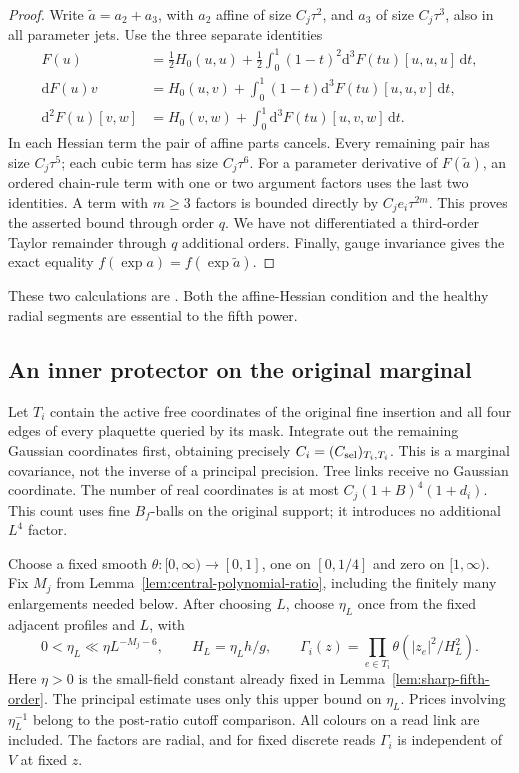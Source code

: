 \documentclass[11pt,reqno]{amsart}
\numberwithin{equation}{section}
\theoremstyle{definition}
\theoremstyle{remark}
\newcommand{\dd}{\mathrm d}
\begin{document}
\begin{proof}
Write \(\widetilde a=a_2+a_3\), with \(a_2\) affine of
size \(C_j\tau^2\), and \(a_3\) of size \(C_j\tau^3\),
also in all parameter jets. Use the three separate identities
\begin{align*}
 F(u)&=\tfrac12H_0(u,u)
       +\tfrac12\int_0^1(1-t)^2\dd^3F(tu)[u,u,u]\,\dd t,\\
 \dd F(u)v&=H_0(u,v)
       +\int_0^1(1-t)\dd^3F(tu)[u,u,v]\,\dd t,\\
 \dd^2F(u)[v,w]&=H_0(v,w)
       +\int_0^1\dd^3F(tu)[u,v,w]\,\dd t.
\end{align*}
In each Hessian term the pair of affine parts cancels.
Every remaining pair has size \(C_j\tau^5\); each cubic
term has size \(C_j\tau^6\). For a parameter derivative
of \(F(\widetilde a)\), an ordered chain-rule term with
one or two argument factors uses the last two identities.
A term with \(m\ge3\) factors is bounded directly by
\(C_je_i\tau^{2m}\). This proves the asserted bound
through order \(q\). We have not differentiated a third-order
Taylor remainder through \(q\) additional orders.
Finally, gauge invariance gives the exact equality
\(f(\exp a)=f(\exp\widetilde a)\).
\end{proof}

These two calculations are
\cite[Lemmas~35.2--35.3, pp.~213--215]{Main}. Both the
affine-Hessian condition and the healthy radial segments
are essential to the fifth power.

\subsection{An inner protector on the original marginal}

Let \(T_i\) contain the active free coordinates of the
original fine insertion and all four edges of every
plaquette queried by its mask. Integrate out the remaining
Gaussian coordinates first, obtaining precisely
\(C_i=(C_{\rm sel})_{T_i,T_i}\). This is a marginal
covariance, not the inverse of a principal precision.
Tree links receive no Gaussian coordinate. The number of
real coordinates is at most \(C_j(1+B)^4(1+d_i)\).
This count uses fine \(B_f\)-balls on the original support;
it introduces no additional \(L^4\) factor.

Choose a fixed smooth \(\theta:[0,\infty)\to[0,1]\), one
on \([0,1/4]\) and zero on \([1,\infty)\). Fix \(M_j\)
from Lemma~\ref{lem:central-polynomial-ratio}, including
the finitely many enlargements needed below. After choosing
\(L\), choose \(\eta_L\) once from the fixed adjacent profiles
and \(L\), with
\begin{equation}
 0<\eta_L\ll\eta L^{-M_j-6},\qquad H_L=\eta_Lh/g,
 \qquad \Gamma_i(z)=\prod_{e\in T_i}\theta(|z_e|^2/H_L^2).
 \label{eq:sharp-inner-protector}
\end{equation}
Here \(\eta>0\) is the small-field constant already fixed
in Lemma~\ref{lem:sharp-fifth-order}. The principal estimate
uses only this upper bound on \(\eta_L\).
Prices involving \(\eta_L^{-1}\) belong to the post-ratio
cutoff comparison.
All colours on a read link are included. The factors are
radial, and for fixed discrete reads \(\Gamma_i\) is
independent of \(V\) at fixed \(z\).
\end{document}
